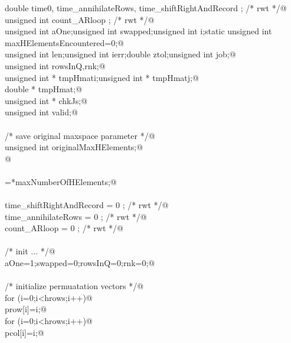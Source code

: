 \documentclass[12pt]{article}
\begin{document}
\begin{flushleft}
\begin{minipage}{\linewidth}
\begin{list}{}{}
\mbox{}\verb@        double time0, time_annihilateRows, time_shiftRightAndRecord ; /* rwt */@\\
\mbox{}\verb@        unsigned int count_ARloop ; /* rwt */@\\
\mbox{}\verb@        unsigned int aOne;unsigned int swapped;unsigned int i;static unsigned int maxHElementsEncountered=0;@\\
\mbox{}\verb@        unsigned int len;unsigned int ierr;double ztol;unsigned int job;@\\
\mbox{}\verb@        unsigned int rowsInQ,rnk;@\\
\mbox{}\verb@        unsigned int * tmpHmati;unsigned int * tmpHmatj;@\\
\mbox{}\verb@        double * tmpHmat;@\\
\mbox{}\verb@        unsigned int * chkJs;@\\
\mbox{}\verb@        unsigned int valid;@\\
\mbox{}\verb@@\\
\mbox{}\verb@        /* save original maxspace parameter */@\\
\mbox{}\verb@        unsigned int originalMaxHElements;@\\
\mbox{}\verb@        @\\
\mbox{}\verb@@\\
\mbox{}\verb@originalMaxHElements=*maxNumberOfHElements;@\\
\mbox{}\verb@@\\
\mbox{}\verb@        time_shiftRightAndRecord = 0 ;  /* rwt */@\\
\mbox{}\verb@        time_annihilateRows = 0 ;               /* rwt */@\\
\mbox{}\verb@        count_ARloop = 0 ;                              /* rwt */@\\
\mbox{}\verb@@\\
\mbox{}\verb@        /* init ... */@\\
\mbox{}\verb@        aOne=1;swapped=0;rowsInQ=0;rnk=0;@\\
\mbox{}\verb@@\\
\mbox{}\verb@        /* initialize permuatation vectors */@\\
\mbox{}\verb@        for (i=0;i<hrows;i++)@\\
\mbox{}\verb@                prow[i]=i;@\\
\mbox{}\verb@        for (i=0;i<hrows;i++)@\\
\mbox{}\verb@            pcol[i]=i;@\\
\mbox{}\verb@@\\

\end{list}
\end{minipage}
\end{flushleft}
\end{document}
